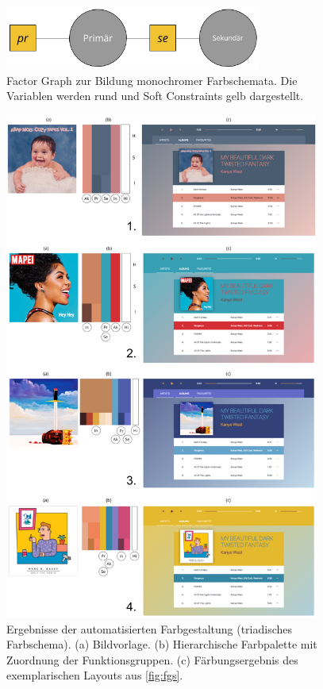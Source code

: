 \begin{figure}[h]
\centering
\includegraphics[width=0.75\textwidth]{img/scheme_monochrom.png}
\caption{Factor Graph zur Bildung monochromer Farbschemata. Die Variablen werden rund und Soft Constraints gelb dargestellt.}
\label{fig:scheme_monochrom}
\end{figure}

\begin{figure}[h]
\centering
\includegraphics[width=0.92\textwidth]{img/results_triadic.png}
\caption{Ergebnisse der automatisierten Farbgestaltung (triadisches Farbschema). (a) Bildvorlage. (b) Hierarchische Farbpalette mit Zuordnung der Funktionsgruppen. (c) Färbungsergebnis des exemplarischen Layouts aus \autoref{fig:fgs}.}
\label{fig:results_triadic}
\end{figure}


